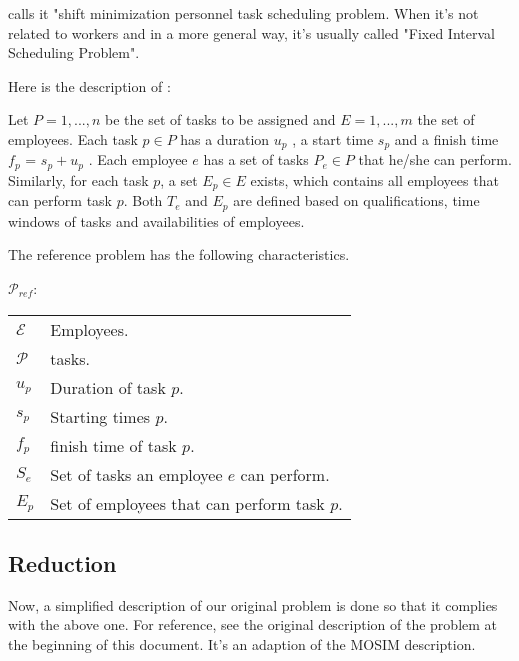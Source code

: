 \documentclass[a4paper,11pt]{article}
\begin{document}
    \cite{Smet2015} calls it "shift minimization personnel task scheduling problem. When it's not related to workers and in a more general way, it's usually called "Fixed Interval Scheduling Problem".

    Here is the description of \cite{Smet2015}:

    Let $P = {1, ..., n}$ be the set of tasks to be assigned and $E = {1, ..., m}$ the set of employees. Each task $p \in P$ has a duration $u_p$ , a start time $s_p$ and a finish time $f_p$ = $s_p + u_p$ . Each employee $e$ has a set of tasks $P_e \in P$ that he/she can perform. Similarly, for each task $p$, a set $E_p \in E$ exists, which contains all employees that can perform task $p$. Both $T_e$ and $E_p$ are defined based on qualifications, time windows of tasks and availabilities of employees.

    The reference problem has the following characteristics.

    $\mathcal{P}_{ref}$:

    \begin{tabular}{ll}
        $\mathcal{E}$       & Employees. \\
        $\mathcal{P}$       & tasks.  \\
        $u_p$     			&  Duration of task $p$. \\
        $s_p$     			&  Starting times $p$. \\
        $f_p$     			&  finish time of task $p$. \\
        $S_e$     &  Set of tasks an employee $e$ can perform. \\
        $E_p$ &  Set of employees that can perform task $p$. \\
    \end{tabular}

    \subsection{Reduction}

    Now, a simplified description of our original problem is done so that it complies with the above one. For reference, see the original description of the problem at the beginning of this document. It's an adaption of the MOSIM description.


\end{document}
